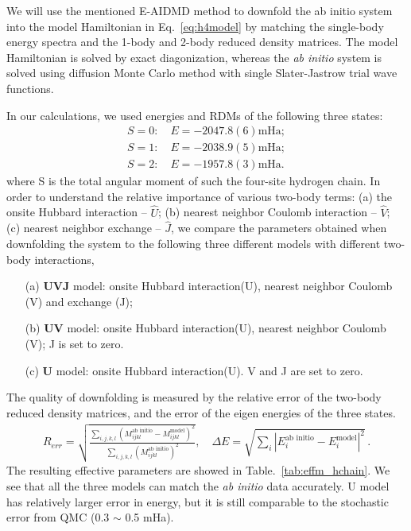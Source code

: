 \documentclass[aps, prb]{revtex4-1}
\begin{document}
We will use the mentioned E-AIDMD method to downfold the ab initio system into the model Hamiltonian in Eq.~\eqref{eq:h4model} by matching the single-body energy spectra and the 1-body and 2-body reduced density matrices. The model Hamiltonian is solved by exact diagonization, whereas the \textit{ab initio} system is solved using diffusion Monte Carlo method with single Slater-Jastrow trial wave functions. 

In our calculations, we used energies and RDMs of the following three states:
\begin{subequations}
\begin{eqnarray}
S=0: \quad E = -2047.8(6) \text{mHa}; \\
S=1: \quad E = -2038.9(5) \text{mHa}; \\
S=2: \quad E = -1957.8(3) \text{mHa}.
\end{eqnarray}
\end{subequations}
where S is the total angular moment of such the four-site hydrogen chain. In order to understand the relative importance of various two-body terms: (a) the onsite Hubbard interaction -- $\hat U$; (b) nearest neighbor Coulomb interaction -- $\hat V$; (c) nearest neighbor exchange -- $\hat J$, we compare the parameters obtained when downfolding the system to the following three different models with different two-body interactions,
\begin{itemize}
\item [(a)] \textbf{UVJ} model: onsite Hubbard interaction(U), nearest neighbor Coulomb (V) and exchange (J);
\item [(b)] \textbf{UV} model: onsite Hubbard interaction(U), nearest neighbor Coulomb (V);  J is set to zero. 
\item [(c)] \textbf{U} model: onsite Hubbard interaction(U). V and J are set to zero. 
\end{itemize}

The quality of downfolding is measured by the relative error of the two-body reduced density matrices, and the error of the eigen energies of the three states.
\begin{eqnarray}
R_{err} =\sqrt{\frac{\sum_{i,j,k,l}(M_{ijkl}^\text{ab initio} - M_{ijkl}^\text{model})^{2}}{\sum_{i,j,k,l}(M^\text{ab initio}_{ijkl})^{2} }}, \quad
\Delta E = \sqrt{\sum_{i}|E_{i}^\text{ab initio} - E_{i}^{\text{model}}|^{2}}\,.
\end{eqnarray}
The resulting effective parameters are showed in Table.~\ref{tab:effm_hchain}. We see that all the three models can match the \textit{ab initio} data accurately. U model has relatively larger error in energy, but it is still comparable to the stochastic error from QMC (0.3 $\sim$ 0.5 mHa).
\end{document}
